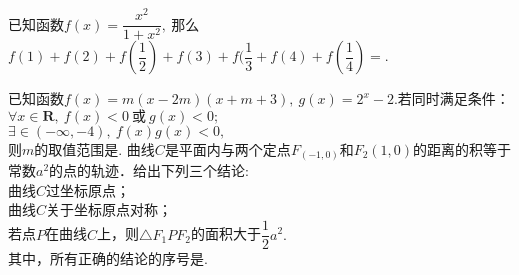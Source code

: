 \documentclass{BHCexam}
\begin{document}
\begin{questions}
\qs 已知函数$f(x)=\dfrac{x^2}{1+x^2},~$那么$ f(1)+f(2)+f(\dfrac{1}{2})+f(3)+f(\dfrac{1}{3}+f(4)+f(\dfrac{1}{4})= $\tk.

\qs 已知函数$f(x)=m(x-2m)(x+m+3),~g(x)=2^x-2.$若同时满足条件：\\
 $ \forall x \in \mathbf{R} ,~f(x)<0~\text{或}~g(x)<0;$\\
 $ \exists \in (-\infty,-4),~f(x)g(x)<0, $\\
则$ m $的取值范围是\tk.
\qs 曲线$C$是平面内与两个定点$ F_(-1,0) $和$F_2(1,0)$的距离的积等于常数$ a^2 $的点的轨迹．给出下列三个结论:\\
 曲线$ C $过坐标原点；\\
 曲线$ C $关于坐标原点对称；\\
 若点$ P $在曲线$ C $上，则$ \triangle F_1PF_2 $的面积大于$ \dfrac{1}{2}a^2. $\\
其中，所有正确的结论的序号是\tk.


\end{questions}
\end{document}
